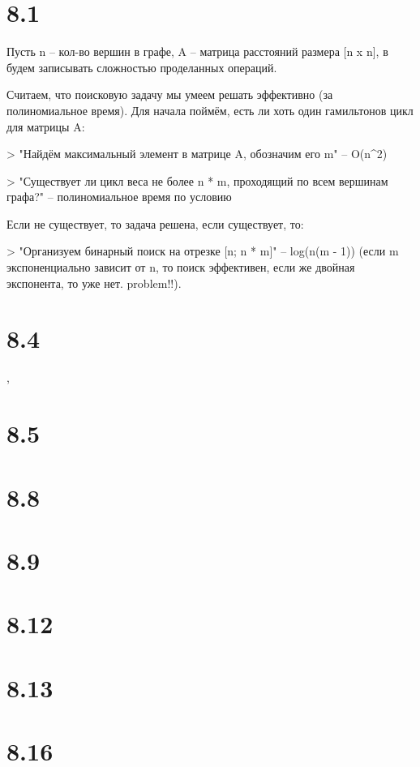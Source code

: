\documentclass[12pt,a4paper]{article}
\begin{document}
\section{8.1}

Пусть n -- кол-во вершин в графе, A -- матрица расстояний размера [n x n], в {} будем записывать сложностью проделанных операций.

Считаем, что поисковую задачу мы умеем решать эффективно (за полиномиальное время). Для начала поймём, есть ли хоть один гамильтонов цикл для матрицы A:

> "Найдём максимальный элемент в матрице A, обозначим его m" -- {O(n^2)}

> "Существует ли цикл веса не более n * m, проходящий по всем вершинам графа?" -- {полиномиальное время по условию}

Если не существует, то задача решена, если существует, то:

> "Организуем бинарный поиск на отрезке [n; n * m]" -- {log(n(m - 1))} (если m экспоненциально зависит от n, то поиск эффективен, если же двойная экспонента, то уже нет. problem!!).

\section{8.4},

\section{8.5}

\section{8.8}

\section{8.9}

\section{8.12}

\section{8.13}

\section{8.16}
\end{document}
